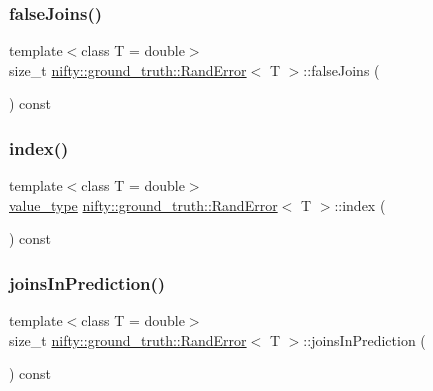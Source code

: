 \subsubsection{\texorpdfstring{false\+Joins()}{falseJoins()}}
{\footnotesize\ttfamily template$<$class T  = double$>$ \\
size\+\_\+t \hyperlink{classnifty_1_1ground__truth_1_1RandError}{nifty\+::ground\+\_\+truth\+::\+Rand\+Error}$<$ T $>$\+::false\+Joins (\begin{DoxyParamCaption}{ }\end{DoxyParamCaption}) const\hspace{0.3cm}{\ttfamily [inline]}}

\mbox{\label{classnifty_1_1ground__truth_1_1RandError_a2e0c1d35e71072c4e77fecdd23e27ca4}} 
\subsubsection{\texorpdfstring{index()}{index()}}
{\footnotesize\ttfamily template$<$class T  = double$>$ \\
\hyperlink{classnifty_1_1ground__truth_1_1RandError_a8ccf604387e3b5ed939c97c22c75acf9}{value\+\_\+type} \hyperlink{classnifty_1_1ground__truth_1_1RandError}{nifty\+::ground\+\_\+truth\+::\+Rand\+Error}$<$ T $>$\+::index (\begin{DoxyParamCaption}{ }\end{DoxyParamCaption}) const\hspace{0.3cm}{\ttfamily [inline]}}

\mbox{\label{classnifty_1_1ground__truth_1_1RandError_afb89270e186dc0c9268b9fe7c5dd56d6}} 
\subsubsection{\texorpdfstring{joins\+In\+Prediction()}{joinsInPrediction()}}
{\footnotesize\ttfamily template$<$class T  = double$>$ \\
size\+\_\+t \hyperlink{classnifty_1_1ground__truth_1_1RandError}{nifty\+::ground\+\_\+truth\+::\+Rand\+Error}$<$ T $>$\+::joins\+In\+Prediction (\begin{DoxyParamCaption}{ }\end{DoxyParamCaption}) const\hspace{0.3cm}{\ttfamily [inline]}}

